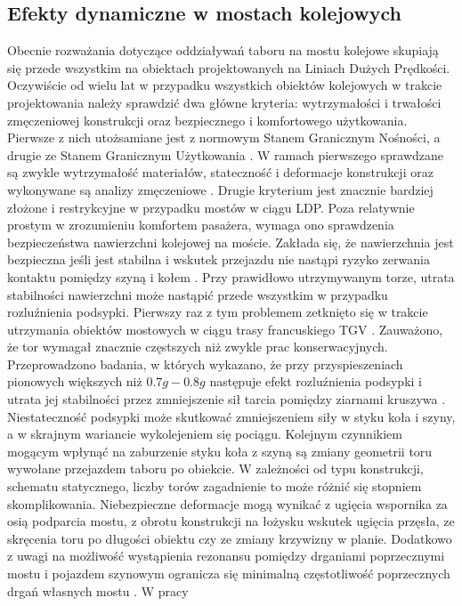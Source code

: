 

\subsection{Efekty dynamiczne w mostach kolejowych} \label{sect:railway_dynamic_effects}

Obecnie rozważania dotyczące oddziaływań taboru na mostu kolejowe skupiają się przede wszystkim na obiektach projektowanych na Liniach Dużych Prędkości. Oczywiście od wielu lat w przypadku wszystkich obiektów kolejowych w trakcie projektowania należy sprawdzić dwa główne kryteria: wytrzymałości i trwałości zmęczeniowej konstrukcji oraz bezpiecznego i komfortowego użytkowania. Pierwsze z nich utożsamiane jest z normowym Stanem Granicznym Nośności, a drugie ze Stanem Granicznym Użytkowania \parencite{PKNc}. W ramach pierwszego sprawdzane są zwykle wytrzymałość materiałów, stateczność i deformacje konstrukcji oraz wykonywane są analizy zmęczeniowe \parencite{Ladislav2008}. Drugie kryterium jest znacznie bardziej złożone i restrykcyjne w przypadku mostów w ciągu LDP. Poza relatywnie prostym w zrozumieniu komfortem pasażera, wymaga ono sprawdzenia bezpieczeństwa nawierzchni kolejowej na moście. Zakłada się, że nawierzchnia jest bezpieczna jeśli jest stabilna i wskutek przejazdu nie nastąpi ryzyko zerwania kontaktu pomiędzy szyną i kołem \parencite{Ramondenc2008}. Przy prawidłowo utrzymywanym torze, utrata stabilności nawierzchni może nastąpić przede wszystkim w przypadku rozluźnienia podsypki. Pierwszy raz z tym problemem zetknięto się w trakcie utrzymania obiektów mostowych w ciągu trasy francuskiego TGV \parencite{Ramondenc1998}. Zauważono, że tor wymagał znacznie częstszych niż zwykle prac konserwacyjnych. Przeprowadzono badania, w których wykazano, że przy przyspieszeniach pionowych większych niż $0.7g-0.8g$ następuje efekt rozluźnienia podsypki i utrata jej stabilności przez zmniejszenie sił tarcia pomiędzy ziarnami kruszywa \parencite{Zacher2008}. Niestateczność podsypki może skutkować zmniejszeniem siły w styku koła i szyny, a w skrajnym wariancie wykolejeniem się pociągu. Kolejnym czynnikiem mogącym wpłynąć na zaburzenie styku koła z szyną są zmiany geometrii toru wywołane przejazdem taboru po obiekcie. W zależności od typu konstrukcji, schematu statycznego, liczby torów zagadnienie to może różnić się stopniem skomplikowania. Niebezpieczne deformacje mogą wynikać z ugięcia wspornika za osią podparcia mostu, z obrotu konstrukcji na łożysku wskutek ugięcia przęsła, ze skręcenia toru po długości obiektu czy ze zmiany krzywizny w planie. Dodatkowo z uwagi na możliwość wystąpienia rezonansu pomiędzy drganiami poprzecznymi mostu i pojazdem szynowym ogranicza się minimalną częstotliwość poprzecznych drgań własnych mostu \parencite{Goicolea2003,Dias2007,Dias2008}. W pracy 
